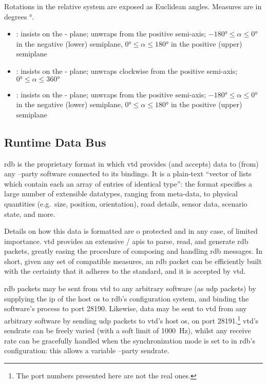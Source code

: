 \FLOATnoindent Rotations in the relative system are exposed as Euclidean angles. Measures are in degrees \si{\degree}.

\begin{itemize}
	\item {}: insists on the - plane; unwraps from the positive  semi-axis; $\ang{-180} \leqslant \alpha \leqslant \ang{0}$ in the negative (lower) semiplane, $\ang{0} \leqslant \alpha \leqslant \ang{180}$ in the positive (upper) semiplane
	\item {}: insists on the - plane; unwraps clockwise from the positive  semi-axis; $\ang{0} \leqslant \alpha \leqslant \ang{360}$
	\item {}: insists on the - plane; unwraps from the positive  semi-axis; $\ang{-180} \leqslant \alpha \leqslant \ang{0}$ in the negative (lower) semiplane, $\ang{0} \leqslant \alpha \leqslant \ang{180}$ in the positive (upper) semiplane
\end{itemize}

\subsection{Runtime Data Bus}

\gls{rdb} is the proprietary format in which \gls{vtd} provides (and accepts) data to (from) any --party software connected to its bindings. It is a plain-text \enquote{vector of lists which contain each an array of entries of identical type}{\cite{software:rdbfaqs}}: the format specifies a large number of extensible datatypes, ranging from meta-data, to physical quantities (e.g.\ size, position, orientation), road details, sensor data, scenario state, and more.

Details on how this data is formatted are o protected and in any case, of limited importance. \gls{vtd} provides an extensive / \glspl{api} to parse, read, and generate \gls{rdb} \glspl{packet}, greatly easing the procedure of composing and handling \gls{rdb} messages. In short, given any set of compatible measures, an \gls{rdb} \gls{packet} can be efficiently built with the certainty that it adheres to the standard, and it is accepted by \gls{vtd}.

\gls{rdb} \glspl{packet} may be sent from \gls{vtd} to any arbitrary software (as \gls{udp} packets) by supplying the \gls{ip} of the host \gls{os} to \gls{rdb}'s configuration system, and binding the software's process to port \num{28190}. Likewise, data may be sent to \gls{vtd} from any arbitrary software by sending \gls{udp} packets to \gls{vtd}'s host \gls{os}, on port \num{28191}.\footnote{The port numbers presented here are not the real ones.} \gls{vtd}'s \gls{sendrate} can be freely varied (with a soft limit of \SI{1000}{\hertz}), whilst any receive rate can be gracefully handled when the synchronization mode is set to  in \gls{rdb}'s configuration: this allows a variable --party \gls{sendrate}.

